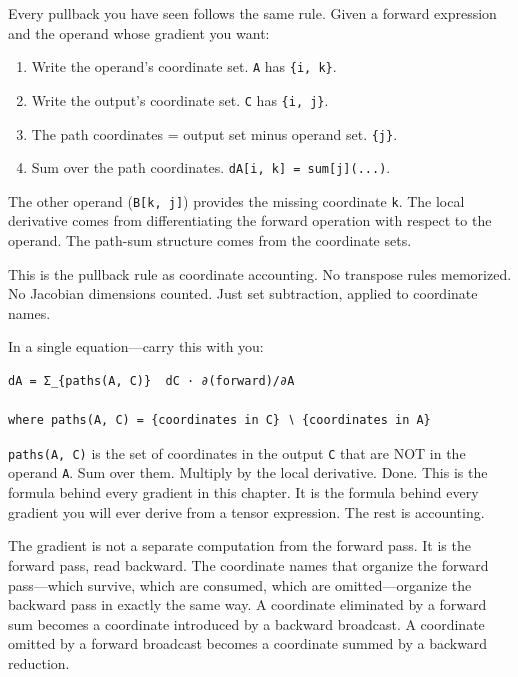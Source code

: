 \documentclass[11pt,titlepage]{article}
\providecommand{\tightlist}{%
  \setlength{\itemsep}{0pt}\setlength{\parskip}{0pt}}
\begin{document}
Every pullback you have seen follows the same rule. Given a forward
expression and the operand whose gradient you want:

\begin{enumerate}
\def\labelenumi{\arabic{enumi}.}
\tightlist
\item
  Write the operand's coordinate set. \texttt{A} has \texttt{\{i,\ k\}}.
\item
  Write the output's coordinate set. \texttt{C} has \texttt{\{i,\ j\}}.
\item
  The path coordinates = output set minus operand set. \texttt{\{j\}}.
\item
  Sum over the path coordinates.
  \texttt{dA{[}i,\ k{]}\ =\ sum{[}j{]}(...)}.
\end{enumerate}

The other operand (\texttt{B{[}k,\ j{]}}) provides the missing
coordinate \texttt{k}. The local derivative comes from differentiating
the forward operation with respect to the operand. The path-sum
structure comes from the coordinate sets.

This is the pullback rule as coordinate accounting. No transpose rules
memorized. No Jacobian dimensions counted. Just set subtraction, applied
to coordinate names.

In a single equation---carry this with you:

\begin{verbatim}
dA = Σ_{paths(A, C)}  dC · ∂(forward)/∂A

where paths(A, C) = {coordinates in C} ∖ {coordinates in A}
\end{verbatim}

\texttt{paths(A,\ C)} is the set of coordinates in the output \texttt{C}
that are NOT in the operand \texttt{A}. Sum over them. Multiply by the
local derivative. Done. This is the formula behind every gradient in
this chapter. It is the formula behind every gradient you will ever
derive from a tensor expression. The rest is accounting.

\vspace{2em}

The gradient is not a separate computation from the forward pass. It is
the forward pass, read backward. The coordinate names that organize the
forward pass---which survive, which are consumed, which are
omitted---organize the backward pass in exactly the same way. A
coordinate eliminated by a forward sum becomes a coordinate introduced
by a backward broadcast. A coordinate omitted by a forward broadcast
becomes a coordinate summed by a backward reduction.
\end{document}
